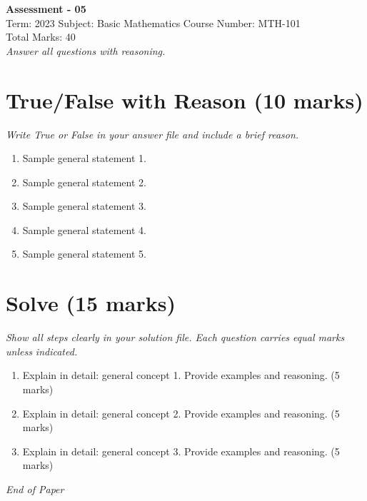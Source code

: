 \documentclass[12pt]{article}
\begin{document}
\begin{center}
\Large \textbf{Assessment - 05} \\[0.5cm]
\large Term: 2023 \quad Subject: Basic Mathematics \quad Course Number: MTH-101 \\[0.3cm]
\large Total Marks: 40 \\
\textit{Answer all questions with reasoning.}
\end{center}

\vspace{0.25cm}

\section*{True/False with Reason (10 marks)}
\textit{Write True or False in your answer file and include a brief reason.}

\begin{enumerate}[label=\arabic*.]

\item Sample general statement 1.

\item Sample general statement 2.

\item Sample general statement 3.

\item Sample general statement 4.

\item Sample general statement 5.

\end{enumerate}

\section*{Solve (15 marks)}
\textit{Show all steps clearly in your solution file. Each question carries equal marks unless indicated.}

\begin{enumerate}[label=\arabic*.]

\item Explain in detail: general concept 1. Provide examples and reasoning.  \hfill (5 marks)

\item Explain in detail: general concept 2. Provide examples and reasoning.  \hfill (5 marks)

\item Explain in detail: general concept 3. Provide examples and reasoning.  \hfill (5 marks)

\end{enumerate}


\vfill
\noindent\textit{End of Paper}
\end{document}
